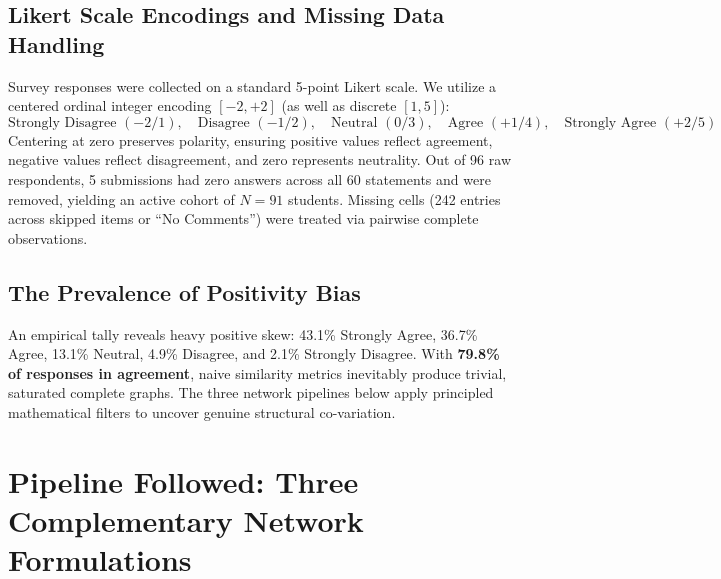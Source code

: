 \documentclass[10pt, a4paper]{article}
\begin{document}
\subsection{Likert Scale Encodings and Missing Data Handling}
Survey responses were collected on a standard 5-point Likert scale. We utilize a centered ordinal integer encoding $[-2, +2]$ (as well as discrete $[1, 5]$):
\[
\text{Strongly Disagree } (-2 / 1), \quad \text{Disagree } (-1 / 2), \quad \text{Neutral } (0 / 3), \quad \text{Agree } (+1 / 4), \quad \text{Strongly Agree } (+2 / 5)
\]
Centering at zero preserves polarity, ensuring positive values reflect agreement, negative values reflect disagreement, and zero represents neutrality. Out of 96 raw respondents, 5 submissions had zero answers across all 60 statements and were removed, yielding an active cohort of $N = 91$ students. Missing cells (242 entries across skipped items or ``No Comments'') were treated via pairwise complete observations.

\subsection{The Prevalence of Positivity Bias}
An empirical tally reveals heavy positive skew: 43.1\% Strongly Agree, 36.7\% Agree, 13.1\% Neutral, 4.9\% Disagree, and 2.1\% Strongly Disagree. With \textbf{79.8\% of responses in agreement}, naive similarity metrics inevitably produce trivial, saturated complete graphs. The three network pipelines below apply principled mathematical filters to uncover genuine structural co-variation.

\section{Pipeline Followed: Three Complementary Network Formulations}
\end{document}
